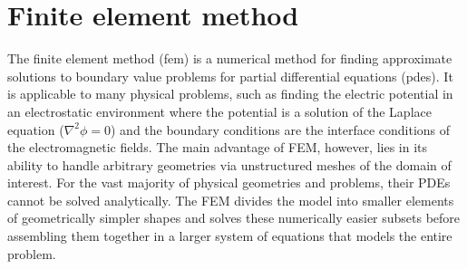 \section{Finite element method}
The finite element method (\ac{fem}) is a numerical method for finding approximate solutions to boundary value problems for partial differential equations (\ac{pde}s). It is applicable to many physical problems, such as finding the electric potential in an electrostatic environment where the potential is a solution of the Laplace equation ($\nabla^2\phi=0$) and the boundary conditions are the interface conditions of the electromagnetic fields.  The main advantage of FEM, however, lies in its ability to handle arbitrary geometries via unstructured meshes of the domain of interest. For the vast majority of physical geometries and problems, their PDEs cannot be solved analytically.  The FEM divides the model into smaller elements of geometrically simpler shapes and solves these numerically easier subsets before assembling them together in a larger system of equations that models the entire problem.




